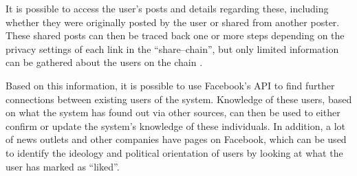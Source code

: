 It is possible to access the user's posts and details regarding these, including whether they were originally
posted by the user or shared from another poster.
These shared posts can then be traced back one or more steps depending on the
privacy settings of each link in the ``share--chain'', but only limited
information can be gathered about the users on the chain \citep{FacebookGraphApiUserFeed}.\nl

Based on this information, it is possible to use Facebook's API to find
further connections between existing users of the system.
Knowledge of these users, based on what the system has found out via other
sources, can then be used to either confirm or update the system's knowledge of
these individuals.
In addition, a lot of news outlets and other companies have pages on Facebook,
which can be used to identify the ideology and political orientation of
users by looking at what the user has marked as ``liked''.
